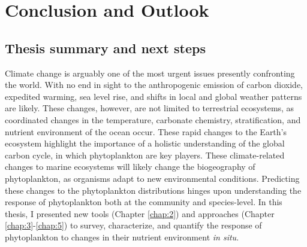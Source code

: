\chapter{Conclusion and Outlook}
\label{chap:6}
\clearpage
\raggedbottom

\section{Thesis summary and next steps}
  
Climate change is arguably one of the most urgent issues presently confronting the world. With no end in sight to the anthropogenic emission of carbon dioxide, expedited warming, sea level rise, and shifts in local and global weather patterns are likely. These changes, however, are not limited to terrestrial ecosystems, as coordinated changes in the temperature, carbonate chemistry, stratification, and nutrient environment of the ocean occur. These rapid changes to the Earth's ecosystem highlight the importance of a holistic understanding of the global carbon cycle, in which phytoplankton are key players. These climate-related changes to marine ecosystems will likely change the biogeography of phytoplankton, as organisms adapt to new environmental conditions. Predicting these changes to the phytoplankton distributions hinges upon understanding the response of phytoplankton both at the community and species-level. In this thesis, I presented new tools (Chapter \ref{chap:2}) and approaches (Chapter \ref{chap:3}-\ref{chap:5}) to survey, characterize, and quantify the response of phytoplankton to changes in their nutrient environment \textit{in situ}. 

